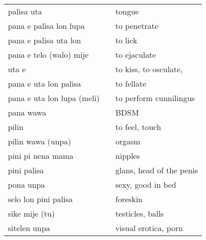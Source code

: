 \begin{supertabular}{p{4,5cm}|ll}
    palisa uta                         &  & tongue                                                                            \\
    pana e palisa lon lupa             &  & to penetrate                                                                      \\
    pana e palisa uta lon              &  & to lick                                                                           \\
    pana e telo (walo) mije            &  & to ejaculate                                                                      \\
    uta e                              &  & to kiss, to osculate,                                                             \\
    pana e uta lon palisa              &  & to fellate                                                                        \\
    pana e uta lon lupa (meli)         &  & to perform cunnilingus                                                            \\
    pana wawa                          &  & BDSM                                                                              \\
    pilin                              &  & to feel, touch                                                                    \\
    pilin wawa (unpa)                  &  & orgasm                                                                            \\
    pini pi nena mama                  &  & nipples                                                                           \\
    pini palisa                        &  & glans, head of the penis                                                          \\
    pona unpa                          &  & sexy, good in bed                                                                 \\
    selo lon pini palisa               &  & foreskin                                                                          \\
    sike mije (tu)                     &  & testicles, balls                                                                  \\
    sitelen unpa                       &  & visual erotica, porn                                                              \\

\end{supertabular}
